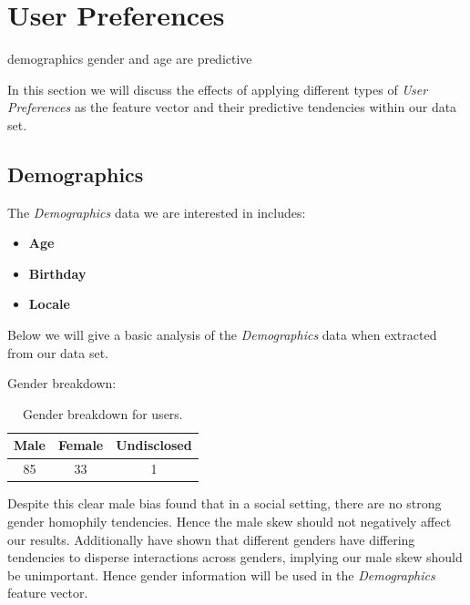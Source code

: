 
\chapter{User Preferences}
\label{cha:ivg}

demographics gender and age are predictive

In this section we will discuss the effects of applying different types of \emph{User Preferences} as the feature vector and 
their predictive tendencies within our data set.

\section{Demographics}
\label{sec:demo}

The \emph{Demographics} data we are interested in includes:
\begin{itemize}
\item \textbf{Age}
\item \textbf{Birthday}
\item \textbf{Locale}
\end{itemize}

Below we will give a basic analysis of the \emph{Demographics} data when extracted from our data set.

Gender breakdown:

\begin{table}[!htbp]
\centering
	\begin{tabular}{|c|c|c|} %
		\hline
		\textbf{Male} & \textbf{Female} & \textbf{Undisclosed}  \\ \hline
		85 & 33 & 1 \\ \hline
	\end{tabular}
	\caption{Gender breakdown for users.}
	\label{tab:revpol}
\end{table}

Despite this clear male bias \cite{jugand} found that in a social setting, there are no strong gender homophily tendencies. Hence the male 
skew should not negatively affect our results. Additionally \cite{backstrom2011center} have shown that different genders have differing 
tendencies to disperse interactions across genders, implying our male skew should be unimportant. Hence gender information will be used in 
the \emph{Demographics} feature vector.

